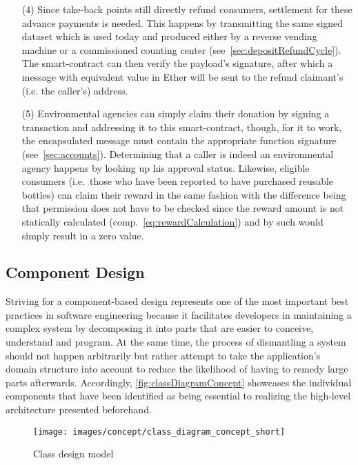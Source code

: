 \begin{itemize}
	\item [(4)] Since take-back points still directly refund consumers, settlement for these advance payments is needed. This happens by transmitting the same signed dataset which is used today and produced either by a reverse vending machine or a commissioned counting center (see~\ref{sec:depositRefundCycle}). The smart-contract can then verify the payload's signature, after which a message with equivalent value in Ether will be sent to the refund claimant's (i.e. the caller's) address. 
	\item [(5)] Environmental agencies can simply claim their donation by signing a transaction and addressing it to this smart-contract, though, for it to work, the encapsulated message must contain the appropriate function signature (see~\ref{sec:accounts}). Determining that a caller is indeed an environmental agency happens by looking up his approval status. Likewise, eligible consumers (i.e.~those who have been reported to have purchased reusable bottles) can claim their reward in the same fashion with the difference being that permission does not have to be checked since the reward amount is not statically calculated (comp.~\autoref{eq:rewardCalculation}) and by such would simply result in a zero value.
\end{itemize}

\subsection{Component Design}
\label{sec:componentDesign}
Striving for a component-based design represents one of the most important best practices in software engineering because it facilitates developers in maintaining a complex system by decomposing it into parts that are easier to conceive, understand and program. At the same time, the process of dismantling a system should not happen arbitrarily but rather attempt to take the application's domain structure into account to reduce the likelihood of having to remedy large parts afterwards. Accordingly, \autoref{fig:classDiagramConcept} showcases the individual components that have been identified as being essential to realizing the high-level architecture presented beforehand.

\begin{figure}[hbt]
	  \texttt{[image: images/concept/class\_diagram\_concept\_short]}
	  \caption{Class design model}
	  \label{fig:classDiagramConcept}
\end{figure}


